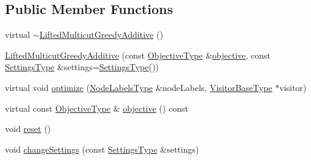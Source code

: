 \subsection*{Public Member Functions}
\begin{DoxyCompactItemize}
\item 
virtual \hyperlink{classnifty_1_1graph_1_1opt_1_1lifted__multicut_1_1LiftedMulticutGreedyAdditive_a2020c4fad935dbe8a664c42052859e53}{$\sim$\+Lifted\+Multicut\+Greedy\+Additive} ()
\item 
\hyperlink{classnifty_1_1graph_1_1opt_1_1lifted__multicut_1_1LiftedMulticutGreedyAdditive_a5d91d77cabd95b20fc04ca9c9a2b868a}{Lifted\+Multicut\+Greedy\+Additive} (const \hyperlink{classnifty_1_1graph_1_1opt_1_1lifted__multicut_1_1LiftedMulticutGreedyAdditive_a0aa12ac484718da875bfca390b69811e}{Objective\+Type} \&\hyperlink{classnifty_1_1graph_1_1opt_1_1lifted__multicut_1_1LiftedMulticutGreedyAdditive_a7c936b75edaaa2ae36f0a9d52dcef156}{objective}, const \hyperlink{classnifty_1_1graph_1_1opt_1_1lifted__multicut_1_1LiftedMulticutGreedyAdditive_aeac1b92946ca3d5e8e9e30f7cc30294d}{Settings\+Type} \&settings=\hyperlink{classnifty_1_1graph_1_1opt_1_1lifted__multicut_1_1LiftedMulticutGreedyAdditive_aeac1b92946ca3d5e8e9e30f7cc30294d}{Settings\+Type}())
\item 
virtual void \hyperlink{classnifty_1_1graph_1_1opt_1_1lifted__multicut_1_1LiftedMulticutGreedyAdditive_a789ec7244197f382b320f72606b50a8e}{optimize} (\hyperlink{classnifty_1_1graph_1_1opt_1_1lifted__multicut_1_1LiftedMulticutGreedyAdditive_a67a2931a00a97fa2838ed9ae1158c7bf}{Node\+Labels\+Type} \&node\+Labels, \hyperlink{classnifty_1_1graph_1_1opt_1_1lifted__multicut_1_1LiftedMulticutGreedyAdditive_a7ae8f1d5534419d919200ed5e74f0f2a}{Visitor\+Base\+Type} $\ast$visitor)
\item 
virtual const \hyperlink{classnifty_1_1graph_1_1opt_1_1lifted__multicut_1_1LiftedMulticutGreedyAdditive_a0aa12ac484718da875bfca390b69811e}{Objective\+Type} \& \hyperlink{classnifty_1_1graph_1_1opt_1_1lifted__multicut_1_1LiftedMulticutGreedyAdditive_a7c936b75edaaa2ae36f0a9d52dcef156}{objective} () const
\item 
void \hyperlink{classnifty_1_1graph_1_1opt_1_1lifted__multicut_1_1LiftedMulticutGreedyAdditive_a81e26cea95a4148beac1ebb4bb16efcd}{reset} ()
\item 
void \hyperlink{classnifty_1_1graph_1_1opt_1_1lifted__multicut_1_1LiftedMulticutGreedyAdditive_abc0c33fd7a9fa4080f30f0e9833c7b94}{change\+Settings} (const \hyperlink{classnifty_1_1graph_1_1opt_1_1lifted__multicut_1_1LiftedMulticutGreedyAdditive_aeac1b92946ca3d5e8e9e30f7cc30294d}{Settings\+Type} \&settings)

\end{DoxyCompactItemize}
